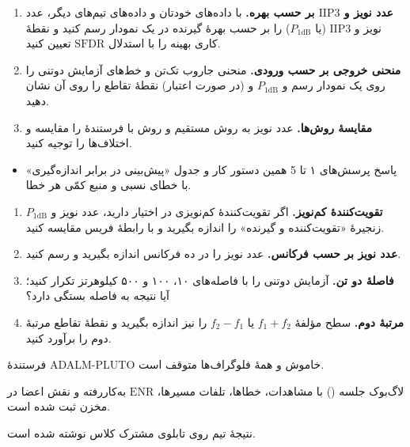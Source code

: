 \documentclass[a4paper,11pt]{article}
\begin{document}
\begin{enumerate}
\item \textbf{عدد نویز و $\mathrm{IIP3}$ بر حسب بهره.} با داده‌های خودتان و داده‌های تیم‌های دیگر، عدد نویز و
$\mathrm{IIP3}$
(یا
$P_{\mathrm{1dB}}$)
را بر حسب بهرهٔ گیرنده در یک نمودار رسم کنید و نقطهٔ کاری بهینه را با استدلال
$\mathrm{SFDR}$
تعیین کنید.
\item \textbf{منحنی خروجی بر حسب ورودی.} منحنی جاروب تک‌تن و خط‌های آزمایش دوتنی را روی یک نمودار رسم و
$P_{\mathrm{1dB}}$
و (در صورت اعتبار) نقطهٔ تقاطع را روی آن نشان دهید.
\item \textbf{مقایسهٔ روش‌ها.} عدد نویز به روش مستقیم و روش
با فرستندهٔ
را مقایسه و اختلاف‌ها را توجیه کنید.
\end{enumerate}


\begin{itemize}
\item پاسخ پرسش‌های ۱ تا 5 همین دستور کار و جدول «پیش‌بینی در برابر اندازه‌گیری» با خطای نسبی و منبع کمّی هر خطا.
\end{itemize}

\begin{enumerate}
\item \textbf{تقویت‌کنندهٔ کم‌نویز.} اگر تقویت‌کنندهٔ کم‌نویزی در اختیار دارید، عدد نویز و
$P_{\mathrm{1dB}}$
زنجیرهٔ «تقویت‌کننده و گیرنده» را اندازه بگیرید و با رابطهٔ فریس مقایسه کنید.
\item \textbf{عدد نویز بر حسب فرکانس.} عدد نویز را در ده فرکانس اندازه بگیرید و رسم کنید.
\item \textbf{فاصلهٔ دو تن.} آزمایش دوتنی را با فاصله‌های ۱۰، ۱۰۰ و ۵۰۰ کیلوهرتز تکرار کنید؛ آیا نتیجه به فاصله بستگی دارد؟
\item \textbf{مرتبهٔ دوم.} سطح مؤلفهٔ
$f_1 + f_2$
یا
$f_2 - f_1$
را نیز اندازه بگیرید و نقطهٔ تقاطع مرتبهٔ دوم را برآورد کنید.
\end{enumerate}

\begin{checklist}
\item فرستندهٔ ADALM-PLUTO خاموش و همهٔ فلوگراف‌ها متوقف است.
\item لاگ‌بوک جلسه
()
با مشاهدات، خطاها، تلفات مسیرها،
$\mathrm{ENR}$
به‌کاررفته و نقش اعضا در مخزن ثبت شده است.

\item نتیجهٔ تیم روی تابلوی مشترک کلاس نوشته شده است.
\end{checklist}
\end{document}
